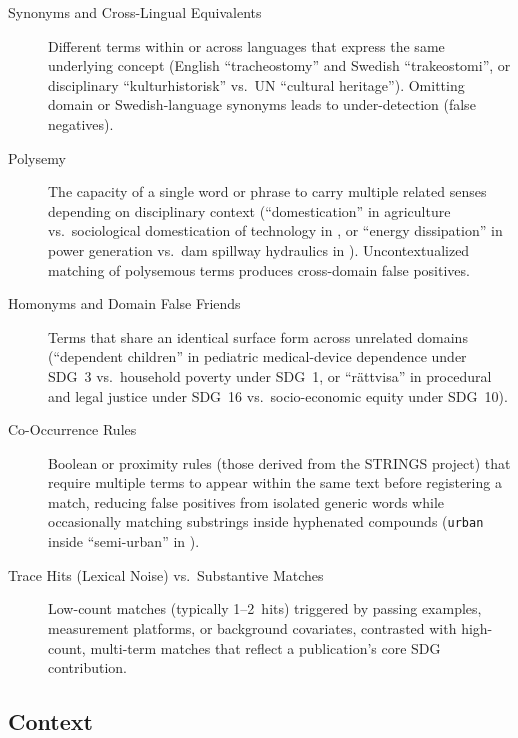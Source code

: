 \begin{description}
    \item[Synonyms and Cross-Lingual Equivalents] Different terms within or across languages that express the same underlying concept (\eg English \enquote{tracheostomy} and Swedish \enquote{\foreignlanguage{swedish}{trakeostomi}}, or disciplinary \enquote{\foreignlanguage{swedish}{kulturhistorisk}} vs.\ \gls{UN} \enquote{cultural heritage}). Omitting domain or Swedish-language synonyms leads to under-detection (false negatives).

    \item[Polysemy] The capacity of a single word or phrase to carry multiple related senses depending on disciplinary context (\eg \enquote{domestication} in agriculture vs.\ sociological domestication of technology in , or \enquote{energy dissipation} in power generation vs.\ dam spillway hydraulics in ). Uncontextualized matching of polysemous terms produces cross-domain false positives.

    \item[Homonyms and Domain False Friends] Terms that share an identical surface form across unrelated domains (\eg \enquote{dependent children} in pediatric medical-device dependence under \gls{SDG}~3 vs.\ household poverty under \gls{SDG}~1, or \enquote{\foreignlanguage{swedish}{rättvisa}} in procedural and legal justice under \gls{SDG}~16 vs.\ socio-economic equity under \gls{SDG}~10).

    \item[Co-Occurrence Rules] Boolean or proximity rules (\eg those derived from the STRINGS project) that require multiple terms to appear within the same text before registering a match, reducing false positives from isolated generic words while occasionally matching substrings inside hyphenated compounds (\eg \texttt{urban} inside \enquote{semi-urban} in ).

    \item[Trace Hits (Lexical Noise) vs.\ Substantive Matches] Low-count matches (typically \num{1}--\num{2}~hits) triggered by passing examples, measurement platforms, or background covariates, contrasted with high-count, multi-term matches that reflect a publication's core \gls{SDG} contribution.
\end{description}

\subsection{Context}
\label{sec:context}

